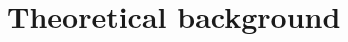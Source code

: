 \documentclass[CHICAGO,Times1COL]{WileyNJDv5} %
\begin{document}










\section{Theoretical background}
\label{sec:theory}
\end{document}
